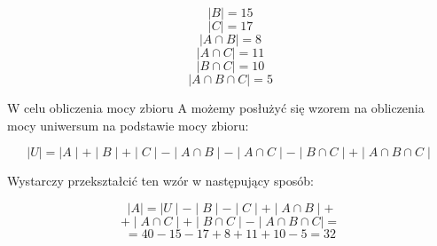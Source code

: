 \documentclass[paper=a4, fontsize=11pt]{scrartcl} %
\numberwithin{equation}{section} %
\numberwithin{figure}{section} %
\numberwithin{table}{section} %
\begin{document}
\begin{equation}
\nonumber
\mid B \mid = 15
\end{equation}
\begin{equation}
\nonumber
\mid C \mid = 17
\end{equation}
\begin{equation}
\nonumber
\mid A \cap B \mid = 8
\end{equation}
\begin{equation}
\nonumber
\mid A \cap C \mid = 11
\end{equation}
\begin{equation}
\nonumber
\mid B \cap C \mid = 10
\end{equation}
\begin{equation}
\nonumber
\mid A \cap B \cap C \mid = 5
\end{equation}
\def\firstcircle{(0,0) circle (1.5cm)}
\def\secondcircle{(60:2cm) circle (1.5cm)}
\def\thirdcircle{(0:2cm) circle (1.5cm)}

W celu obliczenia mocy zbioru A możemy posłużyć się wzorem na obliczenia mocy uniwersum na podstawie mocy zbioru:

\begin{equation}
  \mid U \mid = \mid A \mid + \mid B \mid + \mid C \mid - \mid A \cap B \mid - \mid A \cap C \mid - \mid B \cap C \mid + \mid A \cap B \cap C \mid
\end{equation}

Wystarczy przekształcić ten wzór w następujący sposób:

\begin{equation}
  \nonumber
  \mid A \mid = \mid U \mid - \mid B \mid - \mid C \mid + \mid A \cap B \mid +
\end{equation}
\begin{equation}
  \nonumber
  + \mid A \cap C \mid + \mid B \cap C \mid - \mid A \cap B \cap C \mid = 
\end{equation}
\begin{equation}
  = 40 - 15 - 17 + 8 + 11 + 10 - 5 = 32
\end{equation}
\end{document}
